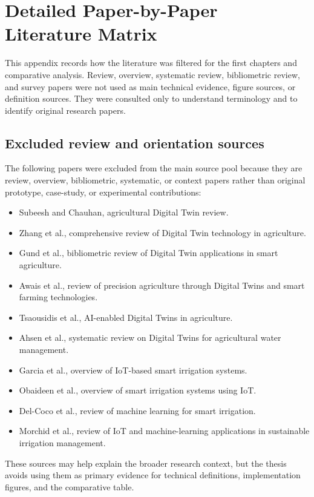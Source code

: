 \chapter{Detailed Paper-by-Paper Literature Matrix}

This appendix records how the literature was filtered for the first chapters and comparative analysis. Review, overview, systematic review, bibliometric review, and survey papers were not used as main technical evidence, figure sources, or definition sources. They were consulted only to understand terminology and to identify original research papers.

\section{Excluded review and orientation sources}

The following papers were excluded from the main source pool because they are review, overview, bibliometric, systematic, or context papers rather than original prototype, case-study, or experimental contributions:

\begin{itemize}
    \item Subeesh and Chauhan, agricultural Digital Twin review.
    \item Zhang et al., comprehensive review of Digital Twin technology in agriculture.
    \item Gund et al., bibliometric review of Digital Twin applications in smart agriculture.
    \item Awais et al., review of precision agriculture through Digital Twins and smart farming technologies.
    \item Tsaousidis et al., AI-enabled Digital Twins in agriculture.
    \item Ahsen et al., systematic review on Digital Twins for agricultural water management.
    \item Garcia et al., overview of IoT-based smart irrigation systems.
    \item Obaideen et al., overview of smart irrigation systems using IoT.
    \item Del-Coco et al., review of machine learning for smart irrigation.
    \item Morchid et al., review of IoT and machine-learning applications in sustainable irrigation management.
\end{itemize}

These sources may help explain the broader research context, but the thesis avoids using them as primary evidence for technical definitions, implementation figures, and the comparative table.

